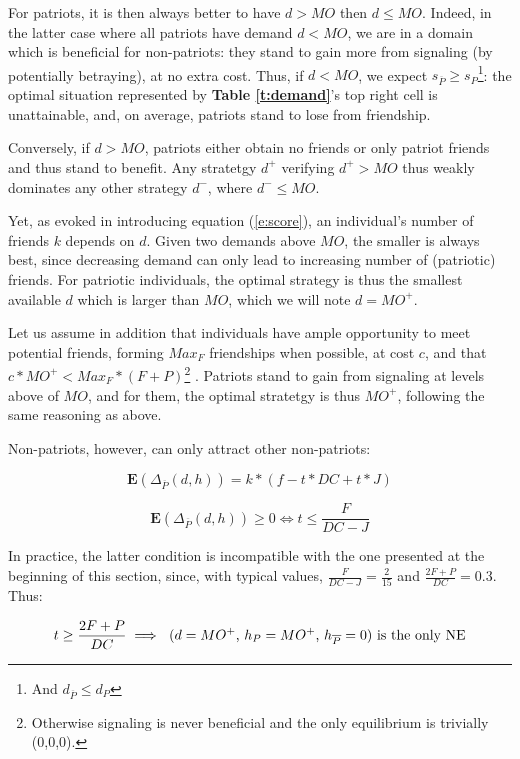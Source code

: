 \documentclass[a4paper,12pt]{report}
\begin{document}
For patriots, it is then always better to have $d > MO$ then $d \leq MO$. Indeed, in the latter
case where all patriots have demand $d < MO$, we are in a domain which is beneficial
for non-patriots: they stand to gain more from signaling (by potentially betraying),
at no extra cost. Thus, if $d < MO$, we expect $s_{\overline{P}} 
\geq s_P$\footnote{And $d_{\overline{P}} \leq d_P$}: the optimal situation represented
by \textbf{Table \ref{t:demand}}'s top right cell is unattainable, and, on average, patriots
stand to lose from friendship.

Conversely, if $d > MO$, patriots either obtain no friends or only patriot friends and
thus stand to benefit. Any stratetgy $d^+$ verifying $d^+>MO$ thus weakly dominates any other strategy $d^-$,
where $d^- \leq MO$.

Yet, as evoked in introducing equation (\ref{e:score}), an individual's number of friends $k$
depends on $d$. Given two demands above $MO$, the smaller is always best, since decreasing 
demand can only lead to increasing number of (patriotic) friends. For patriotic individuals,
the optimal strategy is thus the smallest available $d$ which is larger than $MO$,
which we will note $d = MO^{+}$.


Let us assume in addition that individuals have ample opportunity to meet potential friends,
forming $Max_F$ friendships when possible, at cost $c$,
and that $c * MO^+ < Max_F * (F+P)$\footnote{Otherwise signaling is never beneficial
and the only equilibrium is trivially (0,0,0).} . 
Patriots stand to gain from signaling at levels above of $MO$, and for them,
the optimal stratetgy is thus $MO^{+}$, following the same reasoning as above.

Non-patriots, however, can only attract other non-patriots:

\[ \mathbf{E}(\Delta_{\overline{P}}(d,h)) = k*(f - t*DC +t*J) \]

\[ \mathbf{E}(\Delta_{\overline{P}}(d,h)) \geq 0 \iff t \leq \frac{F}{DC-J} \]

In practice, the latter condition is incompatible with the one presented at the beginning
of this section, since, with typical values, $\frac{F}{DC-J} = \frac{2}{15}$ and 
$\frac{2F+P}{DC} = 0.3$. Thus:

\begin{equation}
    \label{e:h_ESS}
    t \geq \frac{2F+P}{DC} \implies \textnormal{
        ($d=MO^{+}$, $h_P=MO^{+}$, $h_{\overline{P}}=0$) 
        is the only NE}
\end{equation}
\end{document}
